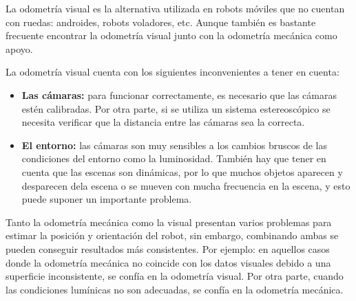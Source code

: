
La odometría visual es la alternativa utilizada en robots móviles que no cuentan
con ruedas: androides, robots voladores, etc. Aunque también es bastante
frecuente encontrar la odometría visual junto con la odometría mecánica como
apoyo.

La odometría visual cuenta con los siguientes inconvenientes a tener en cuenta:

\begin{itemize}
  \item \textbf{Las cámaras:} para funcionar correctamente, es necesario que las
  cámaras estén calibradas. Por otra parte, si se utiliza un sistema
  estereoscópico se necesita verificar que la distancia entre las cámaras sea la
  correcta.
  \item \textbf{El entorno:} las cámaras son muy sensibles a los cambios bruscos
  de las condiciones del entorno como la luminosidad. También hay que tener en
  cuenta que las escenas son dinámicas, por lo que muchos objetos aparecen y
  desparecen dela escena o se mueven con mucha frecuencia en la escena, y esto
  puede suponer un importante problema.
\end{itemize}
    
Tanto la odometría mecánica como la visual presentan varios problemas para
estimar la posición y orientación del robot, sin embargo, combinando ambas se
pueden conseguir resultados más consistentes. Por ejemplo: en aquellos casos
donde la odometría mecánica no coincide con los datos visuales debido a una
superficie inconsistente, se confía en la odometría visual. Por otra parte,
cuando las condiciones lumínicas no son adecuadas, se confía en la odometría
mecánica.

